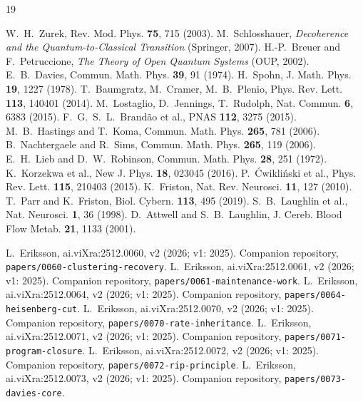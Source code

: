 \documentclass[11pt,a4paper]{article}
\theoremstyle{plain}
\theoremstyle{definition}
\theoremstyle{remark}
\begin{document}
\begin{thebibliography}{19}\small

 W.~H.~Zurek, Rev. Mod. Phys. \textbf{75}, 715 (2003).
 M.~Schlosshauer, \emph{Decoherence and the
Quantum-to-Classical Transition} (Springer, 2007).
 H.-P.~Breuer and F.~Petruccione, \emph{The
Theory of Open Quantum Systems} (OUP, 2002).
 E.~B.~Davies, Commun. Math. Phys. \textbf{39}, 91 (1974).
 H.~Spohn, J. Math. Phys. \textbf{19}, 1227 (1978).
 T.~Baumgratz, M.~Cramer, M.~B.~Plenio, Phys. Rev.
Lett. \textbf{113}, 140401 (2014).
 M.~Lostaglio, D.~Jennings, T.~Rudolph, Nat. Commun.
\textbf{6}, 6383 (2015).
 F.~G.~S.~L.~Brand\~ao et al., PNAS \textbf{112}, 3275
(2015).
 M.~B.~Hastings and T.~Koma, Commun. Math. Phys.
\textbf{265}, 781 (2006).
 B.~Nachtergaele and R.~Sims, Commun. Math. Phys.
\textbf{265}, 119 (2006).
 E.~H.~Lieb and D.~W.~Robinson, Commun. Math. Phys.
\textbf{28}, 251 (1972).
 K.~Korzekwa et al., New J. Phys. \textbf{18}, 023045
(2016).
 P.~\'Cwikli\'nski et al., Phys. Rev. Lett.
\textbf{115}, 210403 (2015).
 K.~Friston, Nat. Rev. Neurosci. \textbf{11}, 127 (2010).
 T.~Parr and K.~Friston, Biol. Cybern. \textbf{113},
495 (2019).
 S.~B.~Laughlin et al., Nat. Neurosci. \textbf{1}, 36
(1998).
 D.~Attwell and S.~B.~Laughlin, J. Cereb. Blood
Flow Metab. \textbf{21}, 1133 (2001).

 L.~Eriksson, ai.viXra:2512.0060, v2 (2026; v1: 2025).
Companion repository, \texttt{papers/0060-clustering-recovery}.
 L.~Eriksson, ai.viXra:2512.0061, v2 (2026; v1: 2025).
Companion repository, \texttt{papers/0061-maintenance-work}.
 L.~Eriksson, ai.viXra:2512.0064, v2 (2026; v1: 2025).
Companion repository, \texttt{papers/0064-heisenberg-cut}.
 L.~Eriksson, ai.viXra:2512.0070, v2 (2026; v1: 2025).
Companion repository, \texttt{papers/0070-rate-inheritance}.
 L.~Eriksson, ai.viXra:2512.0071, v2 (2026; v1: 2025).
Companion repository, \texttt{papers/0071-program-closure}.
 L.~Eriksson, ai.viXra:2512.0072, v2 (2026; v1: 2025).
Companion repository, \texttt{papers/0072-rip-principle}.
 L.~Eriksson, ai.viXra:2512.0073, v2 (2026; v1: 2025).
Companion repository, \texttt{papers/0073-davies-core}.

\end{thebibliography}
\end{document}
